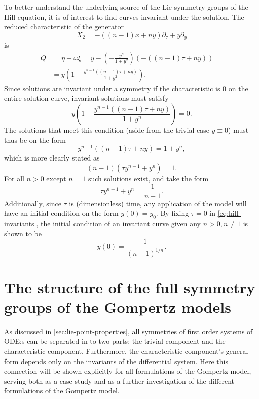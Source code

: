 To better understand the underlying source of the Lie symmetry groups of the Hill equation, it is of interest to find curves invariant under the solution.
The reduced characteristic of the generator
\begin{equation}
  X_2 = - \left( (n-1) x + n y \right) \partial_\tau + y \partial_y
\end{equation}
is
\begin{align}
  \bar{Q} &= 
  \eta - \omega \xi = 
  y - \left( -\frac{y^n}{1+y^2} \right) \left( - \left( (n-1) \tau + n y \right) \right) =\\
  &= y \left(1 -\frac{y^{n-1} \left( (n-1) \tau + n y \right)}{1+y^2} \right).
\end{align}
Since solutions are invariant under a symmetry if the characteristic is 0 on the entire solution curve, invariant solutions must satisfy
\begin{equation}
  y \left(1 -\frac{y^{n-1} \left( (n-1) \tau + n y \right)}{1+y^n} \right) = 0.
\end{equation}
The solutions that meet this condition (aside from the trivial case \(y \equiv 0\)) must thus be on the form
\begin{equation}
  y^{n-1} \left( (n-1) \tau + n y \right) = 1+y^n,
\end{equation}
which is more clearly stated as
\begin{equation}
  (n-1) \left( \tau y^{n-1} + y^n \right) = 1.
\end{equation}
For all \(n>0\) except \(n=1\) such solutions exist, and take the form
\begin{equation} \label{eq:hill-invariants}
  \tau y^{n-1} + y^n = \frac{1}{n-1}.
\end{equation}
Additionally, since \(\tau\) is (dimensionless) time, any application of the model will have an initial condition on the form \(y(0) = y_0\).
By fixing \(\tau=0\) in \cref{eq:hill-invariants}, the initial condition of an invariant curve given any \(n>0, n\neq1\) is shown to be
\begin{equation}
  y(0) =\frac{1}{(n-1)^{1/n}}.
\end{equation}

\section{The structure of the full symmetry groups of the Gompertz models}

As discussed in \cref{sec:lie-point-properties}, all symmetries of first order systems of ODE:s can be separated in to two parts: the trivial component and the characteristic component.
Furthermore, the characteristic component's general form depends only on the invariants of the differential system.
Here this connection will be shown explicitly for all formulations of the Gompertz model, serving both as a case study and as a further investigation of the different formulations of the Gompertz model.

